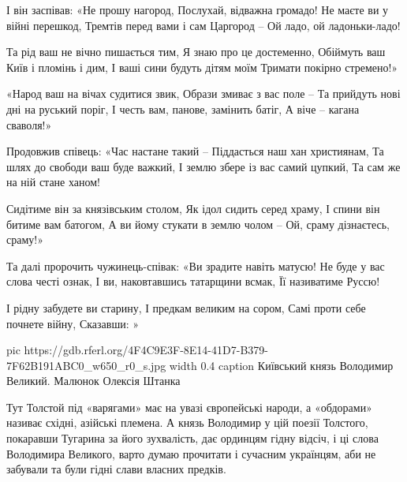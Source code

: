 \begin{multicols}{2}
        \obeycr
І він заспівав: «Не прошу нагород,
Послухай, відважна громадо!
Не маєте ви у війні перешкод,
Тремтів перед вами і сам Царгород –
Ой ладо, ой ладоньки-ладо!

Та рід ваш не вічно пишається тим,
Я знаю про це достеменно,
Обіймуть ваш Київ і пломінь і дим,
І ваші сини будуть дітям моїм
Тримати покірно стремено!»

«Народ ваш на вічах судитися звик,
Образи змиває з вас поле –
Та прийдуть нові дні на руський поріг,
І честь вам, панове, замінить батіг,
А віче – кагана сваволя!»

Продовжив співець: «Час настане такий –
Піддасться наш хан християнам,
Та шлях до свободи ваш буде важкий,
І землю збере із вас самий цупкий,
Та сам же на ній стане ханом!

Сидітиме він за князівським столом,
Як ідол сидить серед храму,
І спини він битиме вам батогом,
А ви йому стукати в землю чолом –
Ой, сраму дізнаєтесь, сраму!»

Та далі пророчить чужинець-співак:
«Ви зрадите навіть матусю!
Не буде у вас слова честі ознак,
І ви, наковтавшись татарщини всмак,
Її називатиме Руссю!

І рідну забудете ви старину,
І предкам великим на сором,
Самі проти себе почнете війну,
Сказавши: »
        \restorecr
\end{multicols}

\ifcmt
pic https://gdb.rferl.org/4F4C9E3F-8E14-41D7-B379-7F62B191ABC0_w650_r0_s.jpg
width 0.4
caption Київський князь Володимир Великий. Малюнок Олексія Штанка 
\fi

Тут Толстой під «варягами» має на увазі європейські народи, а «обдорами»
називає східні, азійські племена. А князь Володимир у цій поезії Толстого,
покаравши Тугарина за його зухвалість, дає ординцям гідну відсіч, і ці слова
Володимира Великого, варто думаю прочитати і сучасним українцям, аби не
забували та були гідні слави власних предків.

